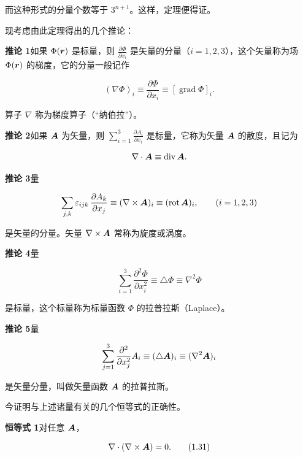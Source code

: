 而这种形式的分量个数等于 $3^{n+1}$。这样，定理便得证。

现考虑由此定理得出的几个推论：

\textbf{推论 1}\quad 如果 $\Phi(\bm{r})$ 是标量，则 $\frac{\partial\Phi}{\partial x_i}$ 是矢量的分量（$i = 1, 2, 3$），这个矢量称为场 $\Phi(\bm{r})$ 的梯度，它的分量一般记作

\begin{equation*}
(\nabla\Phi)_i \equiv \frac{\partial\Phi}{\partial x_i} \equiv [\operatorname{grad}\Phi]_i.
\end{equation*}

算子 $\nabla$ 称为梯度算子（“纳伯拉”）。

\textbf{推论 2}\quad 如果 $\bm{A}$ 为矢量，则 $\sum_{i=1}^{3} \frac{\partial A_i}{\partial x_i}$ 是标量，它称为矢量 $\bm{A}$ 的散度，且记为

\begin{equation*}
\nabla \cdot \bm{A} \equiv \operatorname{div}\bm{A}.
\end{equation*}

\textbf{推论 3}\quad 量

\begin{equation*}
\sum_{j,k} \varepsilon_{ijk}\, \frac{\partial A_k}{\partial x_j} \equiv (\nabla \times \bm{A})_i \equiv (\operatorname{rot}\bm{A})_i, \qquad (i = 1, 2, 3)
\end{equation*}

是矢量的分量。矢量 $\nabla \times \bm{A}$ 常称为旋度或涡度。

\textbf{推论 4}\quad 量

\begin{equation*}
\sum_{i=1}^{3} \frac{\partial^{2}\Phi}{\partial x_i^{2}} \equiv \triangle\Phi \equiv \nabla^{2}\Phi
\end{equation*}

是标量，这个标量称为标量函数 $\Phi$ 的拉普拉斯（Laplace）。

\textbf{推论 5}\quad 量

\begin{equation*}
\sum_{j=1}^{3} \frac{\partial^{2}}{\partial x_j^{2}} A_i \equiv (\triangle\bm{A})_i \equiv (\nabla^{2}\bm{A})_i
\end{equation*}

是矢量分量，叫做矢量函数 $\bm{A}$ 的拉普拉斯。

今证明与上述诸量有关的几个恒等式的正确性。

\textbf{恒等式 1}\quad 对任意 $\bm{A}$，

\begin{equation}
\nabla \cdot (\nabla \times \bm{A}) = 0.
\tag{1.31}
\end{equation}

